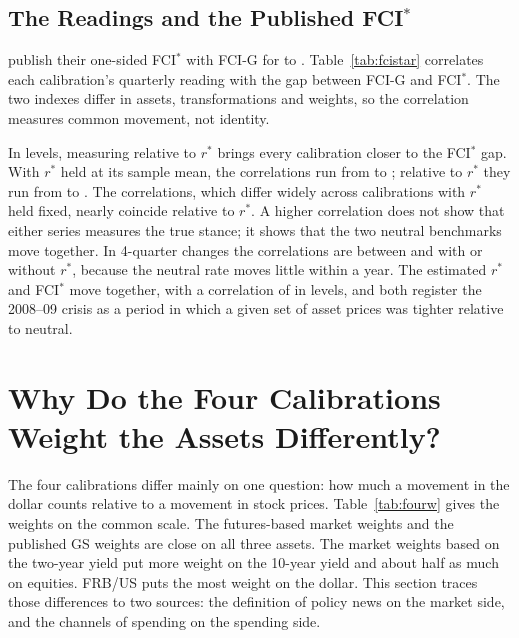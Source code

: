 \documentclass[11pt]{article}
\begin{document}
\subsection{The Readings and the Published FCI$^*$}\label{sec:fcistardata}
\citet{caballero2026} publish their one-sided FCI$^*$ with FCI-G for  to . Table~\ref{tab:fcistar} correlates each calibration's quarterly reading with the gap between FCI-G and FCI$^*$. The two indexes differ in assets, transformations and weights, so the correlation measures common movement, not identity.



In levels, measuring relative to $r^*$ brings every calibration closer to the FCI$^*$ gap. With $r^*$ held at its sample mean, the correlations run from  to ; relative to $r^*$ they run from  to . The correlations, which differ widely across calibrations with $r^*$ held fixed, nearly coincide relative to $r^*$. A higher correlation does not show that either series measures the true stance; it shows that the two neutral benchmarks move together. In 4-quarter changes the correlations are between  and  with or without $r^*$, because the neutral rate moves little within a year. The estimated $r^*$ and FCI$^*$ move together, with a correlation of  in levels, and both register the 2008--09 crisis as a period in which a given set of asset prices was tighter relative to neutral.
\FloatBarrier

\section{Why Do the Four Calibrations Weight the Assets Differently?}\label{sec:agree}
The four calibrations differ mainly on one question: how much a movement in the dollar counts relative to a movement in stock prices. Table~\ref{tab:fourw} gives the weights on the common scale. The futures-based market weights and the published GS weights are close on all three assets. The market weights based on the two-year yield put more weight on the 10-year yield and about half as much on equities. FRB/US puts the most weight on the dollar. This section traces those differences to two sources: the definition of policy news on the market side, and the channels of spending on the spending side.
\end{document}
